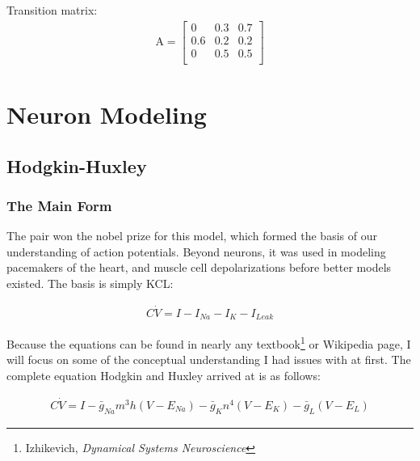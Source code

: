 \documentclass[12pt]{report}
\begin{document}
Transition matrix: 
\begin{align}
\mathrm{A} =
\begin{bmatrix} %
0           &  0.3          & 0.7 \\ 
0.6         &  0.2          & 0.2     \\
0           &   0.5         & 0.5    \\ 
\end{bmatrix}
\end{align}

\chapter{Neuron Modeling}

\section{Hodgkin-Huxley} 

\subsection{The Main Form} The pair won the nobel prize for this model, which formed the basis of our understanding of action potentials. Beyond neurons, it was used in modeling pacemakers of the heart, and muscle cell depolarizations before better models existed.  The basis is simply KCL: 

\bigskip

\begin{equation} \label{hh1}
\begin{split}
C\dot{V} = I - I_{Na} - I_{K} - I_{Leak}
\end{split}
\end{equation}

\bigskip

Because the equations can be found in nearly any textbook\footnote{Izhikevich, \textit{Dynamical Systems Neuroscience}} or Wikipedia page, I will focus on some of the conceptual understanding I had issues with at first. The complete equation Hodgkin and Huxley arrived at is as follows: 

\bigskip

\begin{equation} \label{hh2}
\begin{split}
C\dot{V} = I - \bar{g}_{Na}m^3h(V - E_{Na}) - \bar{g}_{K}n^4(V - E_{K}) - \bar{g}_{L}(V - E_{L})
\end{split}
\end{equation}
\end{document}

